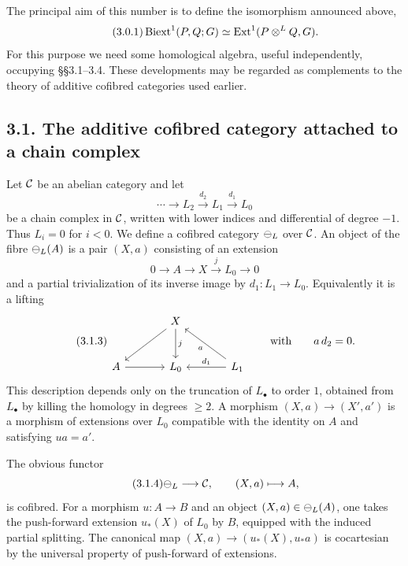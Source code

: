 \documentclass[11pt]{article}
\providecommand{\Ext}{\operatorname{Ext}}
\begin{document}
The principal aim of this number is to define the isomorphism announced above,
\begin{equation}\tag{3.0.1}
  \Biext^1(P,Q;G)\simeq \Ext^1(P\otimes^{L}Q,G).
\end{equation}
For this purpose we need some homological algebra, useful independently, occupying \S\S3.1--3.4.  These developments may be regarded as complements to the theory of additive cofibred categories used earlier.

\subsection*{3.1. The additive cofibred category attached to a chain complex}
Let \(\mathcal C\) be an abelian category and let
\begin{equation}\tag{3.1.1}
  \cdots\longrightarrow L_2\xrightarrow{d_2}L_1\xrightarrow{d_1}L_0
\end{equation}
be a chain complex in \(\mathcal C\), written with lower indices and differential of degree \(-1\).  Thus \(L_i=0\) for \(i<0\).  We define a cofibred category \(\mathcal\Psi_L\) over \(\mathcal C\).  An object of the fibre \(\mathcal\Psi_L(A)\) is a pair \((X,a)\) consisting of an extension
\begin{equation}\tag{3.1.2}
  0\longrightarrow A\longrightarrow X\xrightarrow{j}L_0\longrightarrow 0
\end{equation}
and a partial trivialization of its inverse image by \(d_1:L_1\to L_0\).  Equivalently it is a lifting
\begin{equation}\tag{3.1.3}
\begin{tikzcd}[column sep=large,row sep=large]
& X \arrow[d,"j"]\arrow[dl] & \\
A \arrow[r] & L_0 & L_1\arrow[l,"d_1"']\arrow[ul,"a"]
\end{tikzcd}
\qquad\text{with}\qquad a\,d_2=0.
\end{equation}
This description depends only on the truncation of \(L_\bullet\) to order \(1\), obtained from \(L_\bullet\) by killing the homology in degrees \(\geq2\).  A morphism \((X,a)\to(X',a')\) is a morphism of extensions over \(L_0\) compatible with the identity on \(A\) and satisfying \(u a=a'\).

The obvious functor
\begin{equation}\tag{3.1.4}
  \mathcal\Psi_L\longrightarrow \mathcal C,
  \qquad (X,a)\longmapsto A,
\end{equation}
is cofibred.  For a morphism \(u:A\to B\) and an object \((X,a)\in\mathcal\Psi_L(A)\), one takes the push-forward extension \(u_*(X)\) of \(L_0\) by \(B\), equipped with the induced partial splitting.  The canonical map \((X,a)\to(u_*(X),u_*a)\) is cocartesian by the universal property of push-forward of extensions.
\end{document}
